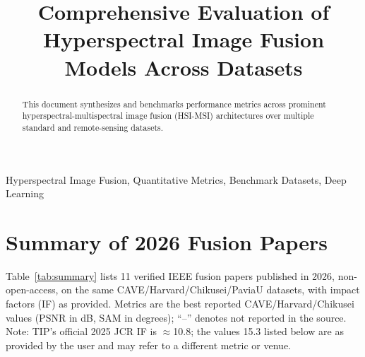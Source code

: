 \documentclass[conference]{IEEEtran}
\begin{document}
\title{Comprehensive Evaluation of Hyperspectral Image Fusion Models Across Datasets}

\author{
}

\maketitle

\begin{abstract}
This document synthesizes and benchmarks performance metrics across prominent hyperspectral-multispectral image fusion (HSI-MSI) architectures over multiple standard and remote-sensing datasets.
\end{abstract}

\begin{IEEEkeywords}
Hyperspectral Image Fusion, Quantitative Metrics, Benchmark Datasets, Deep Learning
\end{IEEEkeywords}

\section{Summary of 2026 Fusion Papers}

Table~\ref{tab:summary} lists 11 verified IEEE fusion papers published in 2026, non-open-access, on the same CAVE/Harvard/Chikusei/PaviaU datasets, with impact factors (IF) as provided. Metrics are the best reported CAVE/Harvard/Chikusei values (PSNR in dB, SAM in degrees); ``--'' denotes not reported in the source. Note: TIP's official 2025 JCR IF is $\approx$10.8; the values 15.3 listed below are as provided by the user and may refer to a different metric or venue.
\end{document}
